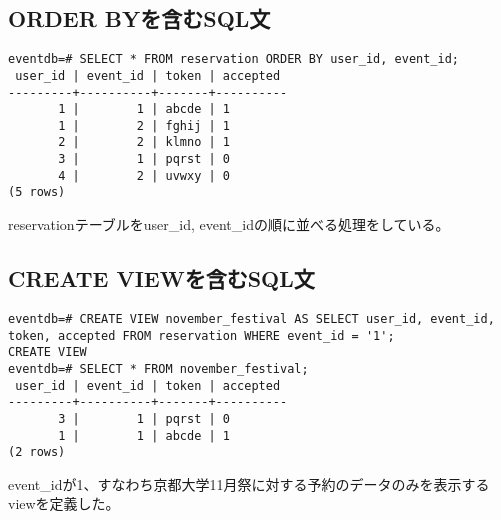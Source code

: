 \documentclass[dvipdfmx]{jarticle}
\begin{document}
\subsection{ORDER BYを含むSQL文}
\begin{lstlisting}
eventdb=# SELECT * FROM reservation ORDER BY user_id, event_id;
 user_id | event_id | token | accepted
---------+----------+-------+----------
       1 |        1 | abcde | 1
       1 |        2 | fghij | 1
       2 |        2 | klmno | 1
       3 |        1 | pqrst | 0
       4 |        2 | uvwxy | 0
(5 rows)
\end{lstlisting}
reservationテーブルをuser\_id, event\_idの順に並べる処理をしている。

\subsection{CREATE VIEWを含むSQL文}
\begin{lstlisting}
eventdb=# CREATE VIEW november_festival AS SELECT user_id, event_id, token, accepted FROM reservation WHERE event_id = '1';
CREATE VIEW
eventdb=# SELECT * FROM november_festival;
 user_id | event_id | token | accepted
---------+----------+-------+----------
       3 |        1 | pqrst | 0
       1 |        1 | abcde | 1
(2 rows)
\end{lstlisting}
event\_idが1、すなわち京都大学11月祭に対する予約のデータのみを表示するviewを定義した。
\end{document}
